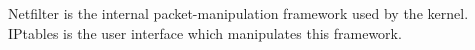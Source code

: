 Netfilter is the internal packet-manipulation framework used by the kernel.
IPtables is the user interface which manipulates this framework.